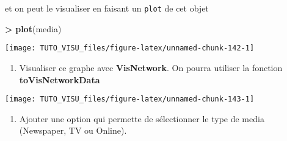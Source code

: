\documentclass[]{book}
\newenvironment{Shaded}{\begin{snugshade}}{\end{snugshade}}
\newcommand{\DataTypeTok}[1]{\textcolor[rgb]{0.13,0.29,0.53}{#1}}
\newcommand{\KeywordTok}[1]{\textcolor[rgb]{0.13,0.29,0.53}{\textbf{#1}}}
\newcommand{\NormalTok}[1]{#1}
\newcommand{\OperatorTok}[1]{\textcolor[rgb]{0.81,0.36,0.00}{\textbf{#1}}}
\newcommand{\StringTok}[1]{\textcolor[rgb]{0.31,0.60,0.02}{#1}}
\providecommand{\tightlist}{%
  \setlength{\itemsep}{0pt}\setlength{\parskip}{0pt}}
\theoremstyle{definition}
\theoremstyle{definition}
\theoremstyle{definition}
\theoremstyle{remark}
\begin{document}
et on peut le visualiser en faisant un \texttt{plot} de cet objet

\begin{Shaded}
\begin{Highlighting}[]
\OperatorTok{>}\StringTok{ }\KeywordTok{plot}\NormalTok{(media)}
\end{Highlighting}
\end{Shaded}

\begin{center}\texttt{[image: TUTO\_VISU\_files/figure-latex/unnamed-chunk-142-1]} \end{center}

\begin{enumerate}
\def\labelenumi{\arabic{enumi}.}
\tightlist
\item
  Visualiser ce graphe avec \textbf{VisNetwork}. On pourra utiliser la fonction \textbf{toVisNetworkData}
\end{enumerate}

\begin{Shaded}
\end{Shaded}

\begin{center}\texttt{[image: TUTO\_VISU\_files/figure-latex/unnamed-chunk-143-1]} \end{center}

\begin{enumerate}
\def\labelenumi{\arabic{enumi}.}
\setcounter{enumi}{1}
\tightlist
\item
  Ajouter une option qui permette de sélectionner le type de media (Newspaper, TV ou Online).
\end{enumerate}

\begin{Shaded}
\end{Shaded}
\end{document}
